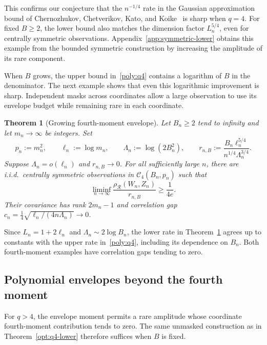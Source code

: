 \documentclass[11pt,letterpaper]{article}
\newtheorem{theorem}{Theorem}
\theoremstyle{remark}
\newcommand{\rh}{\rho_{\mathcal R}}
\begin{document}
This confirms our conjecture that the \(n^{-1/4}\) rate in the Gaussian
approximation bound of Chernozhukov, Chetverikov, Kato, and
Koike~\cite[Theorem~2.5]{CCKK2022} is sharp when \(q=4\).
For fixed \(B\ge2\), the lower bound also matches the dimension factor
\(L_n^{5/4}\), even for centrally symmetric observations.
Appendix~\ref{app:symmetric-lower} obtains this example from the
bounded symmetric construction by increasing the amplitude of its rare
component.

When \(B\) grows, the upper bound in~\eqref{poly:q4} contains a
logarithm of \(B\) in the denominator. The next example shows that even
this logarithmic improvement is sharp. Independent masks across
coordinates allow a large observation to use its envelope budget while
remaining rare in each coordinate.

\begin{theorem}[Growing fourth-moment envelope]\label{opt:q4-growing}
Let \(B_n\ge2\) tend to infinity and let \(m_n\to\infty\) be integers.
Set
\[
 p_n:=m_n^2,\qquad \ell_n:=\log m_n,\qquad
 \Lambda_n:=\log(2B_n^2),\qquad
 r_{n,B}:=\frac{B_n\ell_n^{5/4}}{n^{1/4}\Lambda_n^{3/4}}.
\]
Suppose \(\Lambda_n=o(\ell_n)\) and \(r_{n,B}\to0\).
For all sufficiently large \(n\), there are i.i.d.\ centrally
symmetric observations in \(\mathcal C_4(B_n,p_n)\) such that
\begin{equation}
 \liminf_{n\to\infty}
 \frac{\rh(W_n,Z_n)}{r_{n,B}}\ge\frac1{4e}.
 \label{opt:eq:q4-growing}
\end{equation}
Their covariance has rank \(2m_n-1\) and correlation gap
\(c_n=\frac14\sqrt{\ell_n/(4n\Lambda_n)}\to0\).
\end{theorem}

Since \(L_n=1+2\ell_n\) and \(\Lambda_n\sim2\log B_n\), the lower
rate in Theorem~\ref{opt:q4-growing} agrees up to constants with
the upper rate in~\eqref{poly:q4}, including its dependence on \(B_n\).
Both fourth-moment examples have correlation gaps tending to zero.

\subsection{Polynomial envelopes beyond the fourth moment}

For \(q>4\), the envelope moment permits a rare amplitude whose
coordinate fourth-moment contribution tends to zero. The same unmasked construction as in
Theorem~\ref{opt:q4-lower} therefore suffices when \(B\) is fixed.
\end{document}
